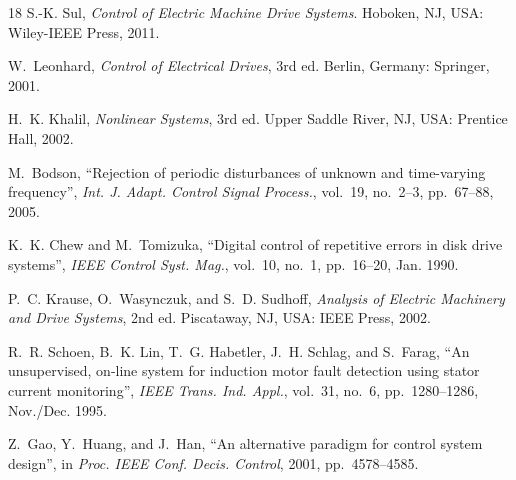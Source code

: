 \documentclass[journal]{IEEEtran}
\theoremstyle{remark}
\newcommand{\qq}[1]{\textquotedblleft#1\textquotedblright}
\begin{document}
\begin{thebibliography}{18}
S.-K. Sul, \emph{Control of Electric Machine Drive Systems}. Hoboken, NJ, USA:
Wiley-IEEE Press, 2011.

W.~Leonhard, \emph{Control of Electrical Drives}, 3rd ed. Berlin, Germany: Springer,
2001.

H.~K. Khalil, \emph{Nonlinear Systems}, 3rd ed. Upper Saddle River, NJ, USA:
Prentice Hall, 2002.

M.~Bodson, \qq{Rejection of periodic disturbances of unknown and time-varying
frequency}, \emph{Int. J. Adapt. Control Signal Process.}, vol.~19, no.~2--3,
pp.~67--88, 2005.

K.~K. Chew and M.~Tomizuka, \qq{Digital control of repetitive errors in disk drive
systems}, \emph{IEEE Control Syst. Mag.}, vol.~10, no.~1, pp.~16--20, Jan. 1990.

P.~C. Krause, O.~Wasynczuk, and S.~D. Sudhoff, \emph{Analysis of Electric Machinery
and Drive Systems}, 2nd ed. Piscataway, NJ, USA: IEEE Press, 2002.

R.~R. Schoen, B.~K. Lin, T.~G. Habetler, J.~H. Schlag, and S.~Farag,
\qq{An unsupervised, on-line system for induction motor fault detection using stator
current monitoring}, \emph{IEEE Trans. Ind. Appl.}, vol.~31, no.~6, pp.~1280--1286,
Nov./Dec. 1995.

Z.~Gao, Y.~Huang, and J.~Han, \qq{An alternative paradigm for control system design},
in \emph{Proc. IEEE Conf. Decis. Control}, 2001, pp.~4578--4585.
\end{thebibliography}
\end{document}
